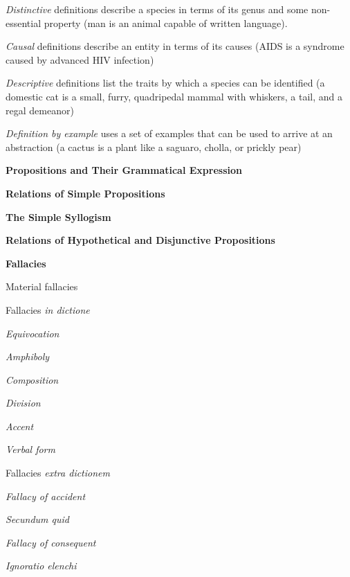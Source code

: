 \documentclass{report}
\begin{document}
\begin{outline}
\begin{outline}
\begin{outline}
                \item \textit{Distinctive} definitions describe a species in terms of its genus and some non-essential property (man is an animal capable of written language).
                \item \textit{Causal} definitions describe an entity in terms of its causes (AIDS is a syndrome caused by advanced HIV infection)
                \item \textit{Descriptive} definitions list the traits by which a species can be identified (a domestic cat is a small, furry, quadripedal mammal with whiskers, a tail, and a regal demeanor)
                \item \textit{Definition by example} uses a set of examples that can be used to arrive at an abstraction (a cactus is a plant like a saguaro, cholla, or prickly pear)
                \end{outline}
    \end{outline}
  \item {\bf Propositions and Their Grammatical Expression}
  \item {\bf Relations of Simple Propositions}
  \item {\bf The Simple Syllogism}
  \item {\bf Relations of Hypothetical and Disjunctive Propositions}
  \item {\bf Fallacies}
  \begin{outline}
  \item Material fallacies
  \item Fallacies \textit{in dictione}
    \begin{outline}
    \item \textit{Equivocation}
    \item \textit{Amphiboly}
    \item \textit{Composition}
    \item \textit{Division}
    \item \textit{Accent}
    \item \textit{Verbal form}
    \end{outline}
  \item Fallacies \textit{extra dictionem}
      \begin{outline}
    \item \textit{Fallacy of accident}
    \item \textit{Secundum quid}
    \item \textit{Fallacy of consequent}
    \item \textit{Ignoratio elenchi}

\end{outline}
\end{outline}
\end{outline}
\end{document}
